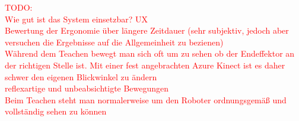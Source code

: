 
\textcolor{red}{TODO:\\
Wie gut ist das System einsetzbar? UX\\
Bewertung der Ergonomie über längere Zeitdauer (sehr subjektiv, jedoch aber versuchen die Ergebnisse auf die Allgemeinheit zu bezienen)\\
Während dem Teachen bewegt man sich oft um zu sehen ob der Endeffektor an der richtigen Stelle ist. Mit einer fest angebrachten Azure Kinect ist es daher schwer den eigenen Blickwinkel zu ändern\\
reflexartige und unbeabsichtigte Bewegungen\\
Beim Teachen steht man normalerweise um den Roboter ordnungsgemäß und vollständig sehen zu können
}



